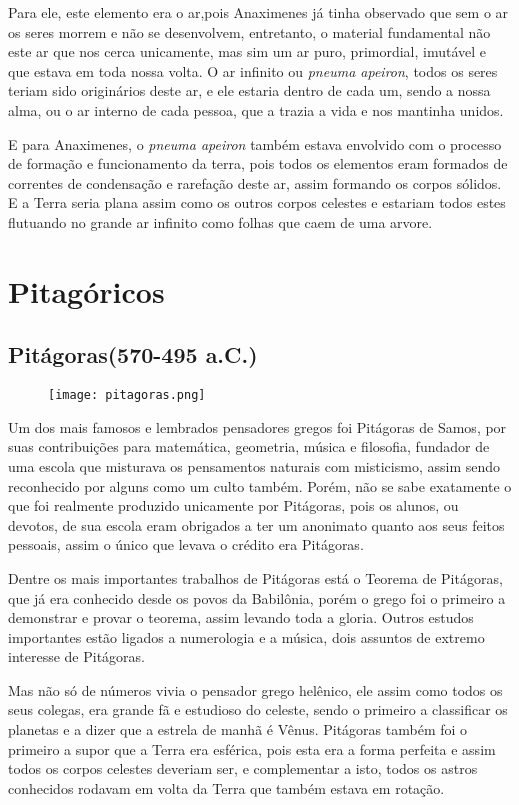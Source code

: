 Para ele, este elemento era o ar,pois Anaximenes já tinha observado que sem o ar os seres morrem e não se desenvolvem, entretanto, o material fundamental não este ar que nos cerca unicamente, mas sim um ar puro, primordial, imutável e que estava em toda nossa volta. O ar infinito ou {\it pneuma apeiron}, todos os seres teriam sido originários deste ar, e ele estaria dentro de cada um, sendo a nossa alma, ou o ar interno de cada pessoa, que a trazia a vida e nos mantinha unidos.

E para Anaximenes, o {\it pneuma apeiron} também estava envolvido com o processo de formação e funcionamento da terra, pois todos os elementos eram formados de correntes de condensação e rarefação deste ar, assim formando os corpos sólidos. E a Terra seria plana assim como os outros corpos celestes e estariam todos estes flutuando no grande ar infinito como folhas que caem de uma arvore.

\section*{Pitagóricos}
\subsection*{Pitágoras(570-495 a.C.)}
\begin{figure}[!htb]
	\centering
	\texttt{[image: pitagoras.png]}
\end{figure}
Um dos mais famosos e lembrados pensadores gregos foi Pitágoras de Samos, por suas contribuições para matemática, geometria, música e filosofia, fundador de uma escola que misturava os pensamentos naturais com misticismo, assim sendo reconhecido por alguns como um culto também. Porém, não se sabe exatamente o que foi realmente produzido unicamente por Pitágoras, pois os alunos, ou devotos, de sua escola eram obrigados a ter um anonimato quanto aos seus feitos pessoais, assim o único que levava o crédito era Pitágoras.

Dentre os mais importantes trabalhos de Pitágoras está o Teorema de Pitágoras, que já era conhecido desde os povos da Babilônia, porém o grego foi o primeiro a demonstrar e provar o teorema, assim levando toda a gloria. Outros estudos importantes estão ligados a numerologia e a música, dois assuntos de extremo interesse de Pitágoras.

Mas não só de números vivia o pensador grego helênico, ele assim como todos os seus colegas, era grande fã e estudioso do celeste, sendo o primeiro a classificar os planetas e a dizer que a estrela de manhã é Vênus. Pitágoras também foi o primeiro a supor que a Terra era esférica, pois esta era a forma perfeita e assim todos os corpos celestes deveriam ser, e complementar a isto, todos os astros conhecidos rodavam em volta da Terra que também estava em rotação.

